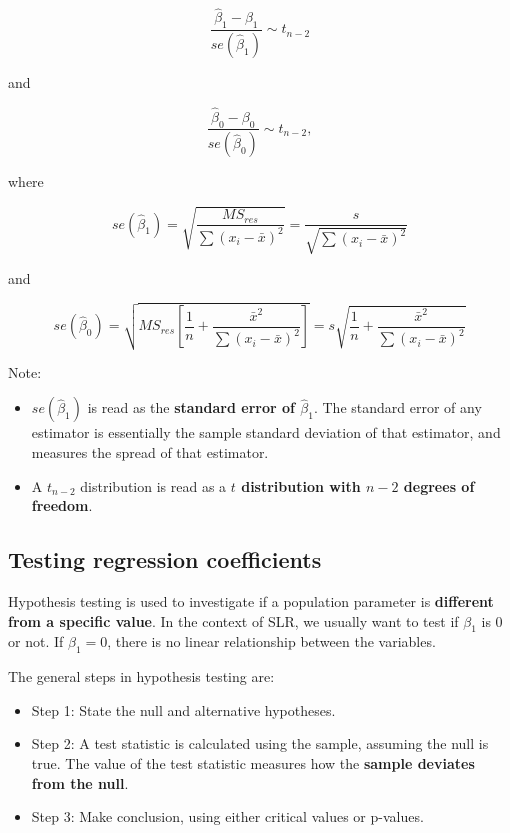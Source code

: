\documentclass[
]{book}
\providecommand{\tightlist}{%
  \setlength{\itemsep}{0pt}\setlength{\parskip}{0pt}}
\begin{document}
\begin{equation} 
\frac{\hat{\beta}_1 - \beta_1}{se(\hat{\beta}_1)}\sim t_{n-2}
\label{eq:distb1}
\end{equation}

and

\begin{equation} 
\frac{\hat{\beta}_0 - \beta_0}{se(\hat{\beta}_0)}\sim t_{n-2},
\label{eq:distb0}
\end{equation}

where

\begin{equation}
se(\hat{\beta}_1) = \sqrt{\frac{MS_{res}}{\sum{(x_{i}-\bar{x})^{2}}}} = \frac{s}{\sqrt{\sum{(x_{i}-\bar{x})^{2}}}}
\label{eq:seb1}
\end{equation}

and

\begin{equation} 
se(\hat{\beta}_0) = \sqrt{MS_{res}\left[\frac{1}{n} + \frac{\bar{x}^2}{\sum (x_i -\bar{x})^2}\right]} = s \sqrt{\frac{1}{n} + \frac{\bar{x}^2}{\sum (x_i -\bar{x})^2}}
\label{eq:seb0}
\end{equation}

Note:

\begin{itemize}
\item
  \(se(\hat{\beta}_1)\) is read as the \textbf{standard error of \(\hat{\beta}_1\)}. The standard error of any estimator is essentially the sample standard deviation of that estimator, and measures the spread of that estimator.
\item
  A \(t_{n-2}\) distribution is read as a \textbf{\(t\) distribution with \(n-2\) degrees of freedom}.
\end{itemize}

\hypertarget{testing-regression-coefficients}{%
\subsection{Testing regression coefficients}\label{testing-regression-coefficients}}

Hypothesis testing is used to investigate if a population parameter is \textbf{different from a specific value}. In the context of SLR, we usually want to test if \(\beta_1\) is 0 or not. If \(\beta_1 = 0\), there is no linear relationship between the variables.

The general steps in hypothesis testing are:

\begin{itemize}
\tightlist
\item
  Step 1: State the null and alternative hypotheses.
\item
  Step 2: A test statistic is calculated using the sample, assuming the null is true. The value of the test statistic measures how the \textbf{sample deviates from the null}.
\item
  Step 3: Make conclusion, using either critical values or p-values.
\end{itemize}
\end{document}
